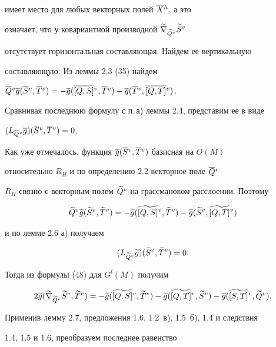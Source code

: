 \begin{pf}
имеет место для любых векторных полей $\overline {X}{}^h$, а это


означает, что у ковариантной производной $\widetilde\nabla_{\widetilde Q{}^v}{\widetilde {S}{}^v}$


отсутствует горизонтальная составляющая. Найдем ее вертикальную


составляющую. Из леммы 2.3 (35) найдем


$\olv{Q}\ol{g}(\olv{S},\olv{T})=-\ol{g}(\olv{[Q,S]},\olv{T})-


\ol{g}(\olv{T},\olv{[Q,T]})$.


Сравнивая последнюю формулу с п.\,а) леммы 2.4, представим ее в виде


$(L_{\overline {Q}{}^v}\overline{g})(\overline {S}{}^v,\overline {T}{}^v)=0$.


Как уже отмечалось, функция $\overline{g}(\overline {S}{}^v,\overline {T}{}^v)$ базисная на $O(M)$


относительно $R_H$ и по определению 2.2 векторное поле $\overline {Q}{}^v$\;


$R_H$-связно с векторным полем $\widetilde {Q}{}^v$ на грассмановом расслоении. Поэтому


\begin{equation}




\grv{Q}\g{g}(\grv{S},\grv{T})=


-\g{g}(\grv{[Q,S]},\grv{T})-\g{g}(\grv{S},\grv{[Q,T]})


\end{equation}


и по лемме 2.6 а) получаем


\begin{equation}




(L_{\tvQ}\g{g})(\grv{S},\grv{T})=0.


\end{equation}


Тогда из формулы (48) для $G^l(M)$ получим


\begin{equation}




2\g{g}(\grn{\tvQ}{\grv{S}},\grv{T})=-\g{g}(\grv{[Q,S]},\grv{T})-


\g{g}(\grv{[Q,T]},\grv{S})-\g{g}(\grv{[S,T]},\grv{Q}).


\end{equation}


Применив лемму 2.7, предложения 1.6, 1.2~в), 1.5~б), 1.4 и следствия


1.4, 1.5 и 1.6, преобразуем последнее равенство



\end{pf}
